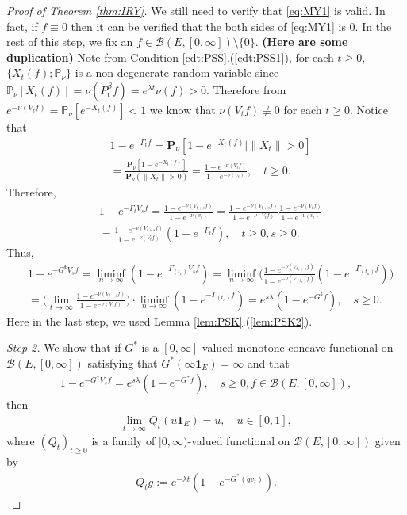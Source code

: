 \documentclass[12pt,a4paper]{amsart}
\numberwithin{equation}{section}
\theoremstyle{plain}
\theoremstyle{definition}
\begin{document}
\begin{proof}[Proof of Theorem \ref{thm:IRY}]
  We still need to verify that \eqref{eq:MY1} is valid.
  In fact, if $f\equiv 0$ then it can be verified that the both sides of \eqref{eq:MY1} is $0$.
  In the rest of this step, we fix an $f\in \mathcal B(E,[0,\infty])\setminus \{0\}$.
  {\bf (Here are some duplication)} Note from Condition \ref{cdt:PSS}.(\ref{cdt:PSS1}), for each $t\geq 0$, $\{X_t(f);\mathbb P_\nu\}$ is a non-degenerate random variable since $\mathbb P_\nu[X_t(f)] = \nu(P_t^\beta f) = e^{\lambda t}\nu(f)>0$. 
  Therefore from $e^{-\nu(V_tf)} = \mathbb P_\nu[e^{-X_t(f)}] < 1$ we know that $\nu(V_tf) \not\equiv 0$ for each $t\geq 0$.  
  Notice that
  \begin{align}
    \label{eq:MY2}
    & 1 - e^{- \Gamma_t f} 
    = \mathbf P_\nu [ 1 - e^{-X_t(f)} | \|X_t\|> 0] \\
    & = \frac{ \mathbf P_\nu [ 1 - e^{- X_t(f)}]}{ \mathbf P_\nu (\|X_t\| > 0)}
    = \frac{ 1 - e^{- \nu(V_tf)} }{ 1 - e^{- \nu(v_t)}},
    \quad t \geq 0.
  \end{align}
  Therefore,
  \begin{align}
    & 1 - e^{- \Gamma_t V_s f}
      = \frac{ 1 - e^{- \nu(V_{t+s} f)} }{ 1 - e^{- \nu(v_t)}}
     = \frac{ 1 - e^{- \nu(V_{t+s} f)} }{ 1 - e^{- \nu(V_tf)}} \frac{ 1 - e^{ - \nu(V_tf)}}{ 1 - e^{- \nu(v_t)}} \\
    & = \frac{ 1 - e^{- \nu(V_{t+s} f)} }{ 1 - e^{- \nu(V_tf)}} ( 1 - e^{- \Gamma_t f})
      , \quad t\geq 0, s \geq 0.
  \end{align}
  Thus,
  \begin{align}
    & 1 - e^{- G^{\mathbf t} V_s f}
      = \liminf_{n\to \infty} ( 1 - e^{- \Gamma_{(t_n)} V_s f})
      = \liminf_{n\to \infty} \Big(  \frac{ 1 - e^{- \nu(V_{t_n+s}f)}}{ 1 - e^{- \nu(V_{(t_n)}f)}} (1 - e^{- \Gamma_{(t_n)} f}) \Big) \\
    & = \Big( \lim_{t \to \infty}   \frac{ 1 - e^{- \nu(V_{t+s}f)}}{ 1 - e^{- \nu(V_{t}f)}} \Big) \cdot \liminf_{n\to \infty} (1 - e^{- \Gamma_{(t_n)} f} ) 
      = e^{s\lambda} (1 - e^{- G^{\mathbf t}f}), \quad s\geq 0.
  \end{align}
  Here in the last step, we used Lemma \ref{lem:PSK}.(\ref{lem:PSK2}).

  \emph{Step 2.}
  We show that if $G^*$ is a $[0,\infty]$-valued monotone concave functional on $\mathcal B(E,[0,\infty])$ satisfying that $G^*(\infty \mathbf 1_E) = \infty$ and that 
  \begin{align}
    1 - e^{- G^* V_sf} = e^{s\lambda} (1- e^{- G^* f}),
    \quad s \geq 0, f \in \mathcal B(E, [0,\infty]),
  \end{align}
  then
  \begin{align}
    \lim_{t\to \infty} Q_t(u \mathbf 1_E) 
    = u,
    \quad u \in [0,1],
  \end{align}
  where $(Q_t)_{t\geq 0}$ is a family of $[0,\infty)$-valued functional on $\mathcal B(E,[0,\infty])$ given by
  \begin{align}
    Q_tg 
    := e^{- \lambda t}( 1 - e^{-G^*(gv_t)} ).
  \end{align}


\end{proof}
\end{document}
